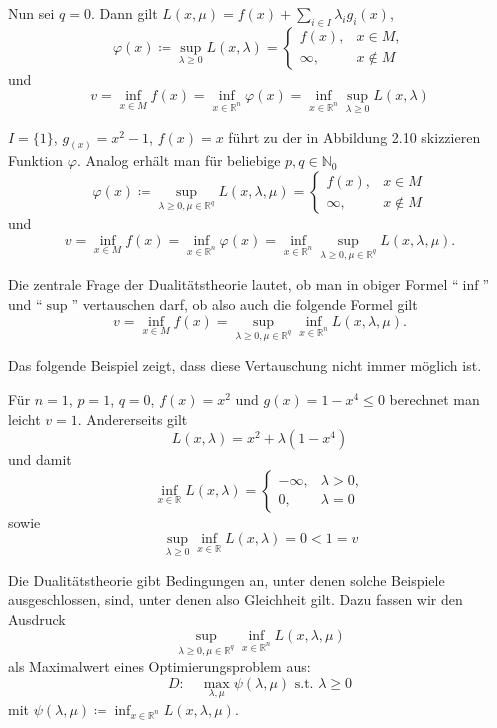 \documentclass[12pt]{extreport} %
\newcommand{\N}{\mathbb{N}}
\newcommand{\R}{\mathbb{R}}
\theoremstyle{named}
\theoremstyle{nnamed}
\theoremstyle{itshape}
\theoremstyle{normal}
\begin{document}
Nun sei $q = 0$. Dann gilt $L(x, \mu) = f(x) + \sum_{i \in I} \lambda_i g_i(x)$,
	$$ \varphi(x) \coloneqq \sup_{\lambda \geq 0} L(x, \lambda) = \begin{cases} f(x), & x \in M, \\ \infty, & x \notin M \end{cases} $$
und 
	$$ v = \inf_{x \in M} f(x) = \inf_{x \in \R^n} \varphi(x) = \inf_{x \in \R^n} \sup_{\lambda \geq 0} L(x, \lambda) $$

\begin{beispiel}
	$I = \{ 1 \}$, $g_(x) = x^2 - 1$, $f(x) = x$ führt zu der in Abbildung 2.10 skizzieren Funktion $\varphi$. Analog erhält man für beliebige $p, q \in \N_0$
		$$ \varphi(x) \coloneqq \sup_{\lambda \geq 0, \mu \in \R^q} L(x, \lambda, \mu) = \begin{cases} f(x), & x \in M \\ \infty, & x \notin M \end{cases} $$	
	und 
		$$ v = \inf_{x \in M} f(x) = \inf_{x \in \R^n} \varphi(x) = \inf_{x \in \R^n} \sup_{\lambda \geq 0, \mu \in \R^q} L(x, \lambda, \mu). $$
\end{beispiel}

Die zentrale Frage der Dualitätstheorie lautet, ob man in obiger Formel \enquote{$\inf$} und \enquote{$\sup$} vertauschen darf, ob also auch die folgende Formel gilt
	$$ v = \inf_{x \in M} f(x) = \sup_{\lambda \geq 0, \mu \in \R^q} \inf_{x \in \R^n} L(x, \lambda, \mu). $$
	
Das folgende Beispiel zeigt, dass diese Vertauschung nicht immer möglich ist.
	
\begin{beispiel}[2.6.2]
	Für $n = 1$, $p = 1$, $q = 0$, $f(x) = x^2$ und $g(x) = 1 - x^4 \leq 0$ berechnet man leicht $v = 1$. Andererseits gilt
		$$ L(x, \lambda) = x^2 + \lambda (1 - x^4) $$
	und damit 
		$$ \inf_{x \in \R} L(x, \lambda) = \begin{cases} - \infty, & \lambda > 0, \\ 0, & \lambda = 0 \end{cases} $$
	sowie
		$$ \sup_{\lambda \geq 0} \inf_{x \in \R} L(x, \lambda) = 0 < 1 = v $$
\end{beispiel}

Die Dualitätstheorie gibt Bedingungen an, unter denen solche Beispiele ausgeschlossen, sind, unter denen also Gleichheit gilt. Dazu fassen wir den Ausdruck 
	$$ \sup_{\lambda \geq 0, \mu \in \R^q} \inf_{x \in \R^n} L(x,\lambda, \mu) $$
	als Maximalwert eines Optimierungsproblem aus:
	$$ D: \quad \max_{\lambda, \mu} \psi(\lambda, \mu) \text{ s.t. } \lambda \geq 0 $$
	mit $\psi(\lambda, \mu) \coloneqq \inf_{x \in \R^n} L(x, \lambda, \mu)$.	
	
\end{document}
